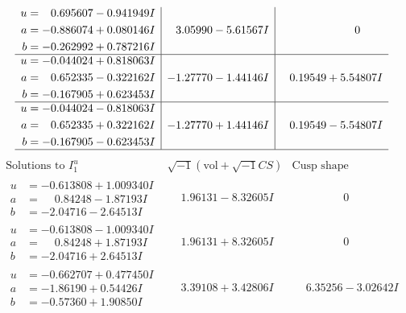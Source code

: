 \documentclass[1p]{elsarticle_modified}
\theoremstyle{definition}
\newcommand{\I}{\sqrt{-1}}
\begin{document}
$$\begin{array}{c|c|c}
\begin{aligned}
u &= \phantom{-}0.695607 - 0.941949 I \\
a &= -0.886074 + 0.080146 I \\
b &= -0.262992 + 0.787216 I\end{aligned}
 & \phantom{-}3.05990 - 5.61567 I & \phantom{-0.000000 } 0 \\ \hline\begin{aligned}
u &= -0.044024 + 0.818063 I \\
a &= \phantom{-}0.652335 - 0.322162 I \\
b &= -0.167905 + 0.623453 I\end{aligned}
 & -1.27770 - 1.44146 I & \phantom{-}0.19549 + 5.54807 I \\ \hline\begin{aligned}
u &= -0.044024 - 0.818063 I \\
a &= \phantom{-}0.652335 + 0.322162 I \\
b &= -0.167905 - 0.623453 I\end{aligned}
 & -1.27770 + 1.44146 I & \phantom{-}0.19549 - 5.54807 I\\
 \hline 
 \end{array}$$\newpage$$\begin{array}{c|c|c}  
\text{Solutions to }I^u_{1}& \I (\text{vol} + \sqrt{-1}CS) & \text{Cusp shape}\\
 \hline 
\begin{aligned}
u &= -0.613808 + 1.009340 I \\
a &= \phantom{-}0.84248 - 1.87193 I \\
b &= -2.04716 - 2.64513 I\end{aligned}
 & \phantom{-}1.96131 - 8.32605 I & \phantom{-0.000000 } 0 \\ \hline\begin{aligned}
u &= -0.613808 - 1.009340 I \\
a &= \phantom{-}0.84248 + 1.87193 I \\
b &= -2.04716 + 2.64513 I\end{aligned}
 & \phantom{-}1.96131 + 8.32605 I & \phantom{-0.000000 } 0 \\ \hline\begin{aligned}
u &= -0.662707 + 0.477450 I \\
a &= -1.86190 + 0.54426 I \\
b &= -0.57360 + 1.90850 I\end{aligned}
 & \phantom{-}3.39108 + 3.42806 I & \phantom{-}6.35256 - 3.02642 I \\ \hline\begin{aligned}

\end{aligned}
\end{array}$$
\end{document}
